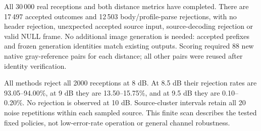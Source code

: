 \documentclass[10pt,letterpaper]{article}
\begin{document}
All 30\,000 real receptions and both distance metrics have completed. There are 17\,497 accepted outcomes and 12\,503 body/profile-parse rejections, with no header rejection, unexpected accepted source input, source-decoding rejection or valid NULL frame. No additional image generation is needed: accepted prefixes and frozen generation identities match existing outputs. Scoring required 88 new native gray-reference pairs for each distance; all other pairs were reused after identity verification.

All methods reject all 2000 receptions at 8 dB. At 8.5 dB their rejection rates are 93.05--94.00\%, at 9 dB they are 13.50--15.75\%, and at 9.5 dB they are 0.10--0.20\%. No rejection is observed at 10 dB. Source-cluster intervals retain all 20 noise repetitions within each sampled source. This finite scan describes the tested fixed policies, not low-error-rate operation or general channel robustness.
\end{document}
